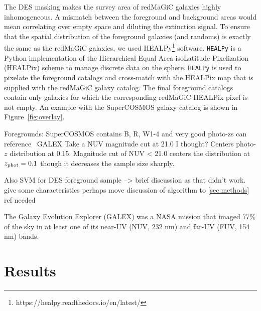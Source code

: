 \documentclass[11pt, oneside]{article}   	%
\begin{document}
The DES masking makes the survey area of redMaGiC galaxies highly inhomogeneous. A mismatch between the foreground and background areas would mean correlating over empty space and diluting the extinction signal. To ensure that the spatial distribution of the foreground galaxies (and randoms) is exactly the same as the redMaGiC galaxies, we used HEALPy\footnote{https://healpy.readthedocs.io/en/latest/} software. \texttt{HEALPy} is a Python implementation of the Hierarchical Equal Area isoLatitude Pixelization (HEALPix) scheme to manage discrete data on the sphere. %
\texttt{HEALPy} is used to pixelate the foreground catalogs and cross-match with the HEALPix map that is supplied with the redMaGiC galaxy catalog. The final foreground catalogs contain only galaxies for which the corresponding redMaGiC HEALPix pixel is not empty. An example with the SuperCOSMOS galaxy catalog is shown in Figure~\ref{fig:overlay}. 
\begin{outline}
\1 Foregrounds:
	\2 SuperCOSMOS
		\3 contains B, R, W1-4 and very good photo-zs
		\3 can reference~\cite{}
	\2 GALEX
		\3 Take a NUV magnitude cut at 21.0 I thought? Centers photo-$z$ distribution at 0.15. Magnitude cut of NUV < 21.0 centers the distribution at $z_{\rm phot} = 0.1$ though it decreases the sample size sharply. 

\1 Also SVM for DES foreground sample --> brief discussion as that didn't work. 
	\2 give some characteristics
	\2 perhaps move discussion of algorithm to \ref{sec:methods}
		\3 ref needed
\end{outline}
The Galaxy Evolution Explorer (GALEX) was a NASA mission that imaged 77\% of the sky in at least one of its near-UV (NUV, 232 nm) and far-UV (FUV, 154 nm) bands. 


\section{Results}
\end{document}
